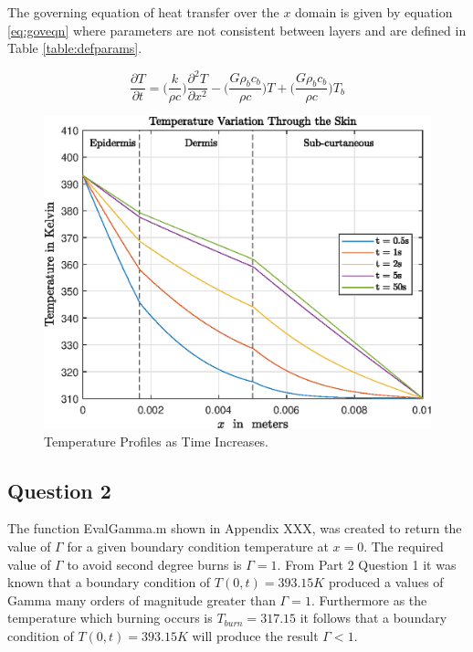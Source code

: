 \documentclass[11pt]{article}
\begin{document}
The governing equation of heat transfer over the $x$ domain is given by equation \ref{eq:goveqn} where parameters are not consistent between layers and are defined in Table \ref{table:defparams}.

\begin{equation} \label{eq:goveqn}
\frac{\partial T}{\partial t}    = \bigg(\frac{k}{\rho c} \bigg)\frac{\partial^2 T}{\partial x^2} - \bigg(\frac{G \rho_b c_b}{\rho c}\bigg)T + \bigg(\frac{G \rho_b c_b}{\rho c}\bigg)T_b
\end{equation}

\begin{figure}[!h]  %
	\centering
	\includegraphics[width=.75\textwidth]{epsQ21TempXT}
    \caption{Temperature Profiles as Time Increases. }\label{fig:q21profs}
\end{figure}


\subsection{Question 2}


The function EvalGamma.m shown in Appendix XXX, was created to return the value of $\Gamma$ for a given boundary condition temperature at $x = 0$. The required value of $\Gamma$ to avoid second degree burns is $\Gamma = 1$. From Part 2 Question 1 it was known that a boundary condition of $T(0, t) = 393.15K$ produced a values of Gamma many orders of magnitude greater than $\Gamma = 1$. Furthermore as the temperature which burning occurs is $T_{burn} = 317.15$ it follows that a boundary condition of $T(0, t) = 393.15K$ will produce the result  $\Gamma < 1$. \\
\end{document}
